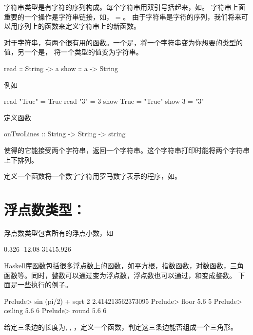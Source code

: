 字符串类型是有字符的序列构成。每个字符串用双引号括起来，如。
字符串上面重要的一个操作是字符串链接\hs{++}，如， = 。
由于字符串是字符的序列，我们将来可以用序列上的函数来定义字符串上的新函数。

对于字符串，有两个很有用的函数。一个是，将一个字符串变为你想要的类型的值，另一个是，
将一个类型的值变为字符串。
\begin{code}
read :: String -> a
show :: a -> String
\end{code}
例如
\begin{xcode}
read "True" = True
read "3"    = 3
show True   = "True"
show 3      = "3"
\end{xcode}

\begin{exercise}
定义函数
\begin{xcode}
onTwoLines :: String -> String -> string
\end{xcode}
使得的它能接受两个字符串，返回一个字符串。这个字符串打印时能将两个字符串上下排列。
\end{exercise}

\begin{exercise}
定义一个函数将一个数字字符用罗马数字表示的程序，如。
\end{exercise}

\section{浮点数类型：}

浮点数类型包含所有的浮点小数，如
\begin{xcode}
0.326
-12.08
31415.926
\end{xcode}
Haskell库函数包括很多浮点数上的函数，如平方根，指数函数，对数函数，三角函数等。同时，整数可以通过变为浮点数，浮点数也可以通过，和变成整数。
下面是一些执行的例子。

\begin{demo}
Prelude> sin (pi/2) + sqrt 2
2.414213562373095
Prelude> floor 5.6
5
Prelude> ceiling 5.6
6
Prelude> round 5.6
6
\end{demo}

\begin{exercise}
给定三条边的长度为, , ，定义一个函数，判定这三条边能否组成一个三角形。
\end{exercise}

